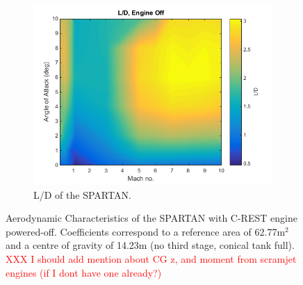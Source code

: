\begin{figure}[ht]
\begin{subfigure}{.5\textwidth}
		\includegraphics[width=0.99\linewidth]{figures/3_vehicle_design/LD}
		\caption{L/D of the SPARTAN.}
		\label{fig:LD}
	\end{subfigure}
	\caption{Aerodynamic Characteristics of the SPARTAN with C-REST engine powered-off. Coefficients correspond to a reference area of 62.77m$^2$ and a centre of gravity of 14.23m (no third stage, conical tank full). \textcolor{red}{XXX I should add mention about CG z, and moment from scramjet engines (if I dont have one already?)}}
	\label{fig:aero1}
\end{figure}

